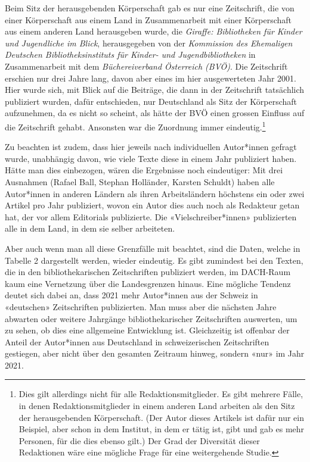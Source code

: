 \documentclass[a4paper,
fontsize=11pt,
oneside,
numbers=noperiodatend,
parskip=half-,
bibliography=totoc,
final
]{scrartcl}
\begin{document}
Beim Sitz der herausgebenden Körperschaft gab es nur eine Zeitschrift,
die von einer Körperschaft aus einem Land in Zusammenarbeit mit einer
Körperschaft aus einem anderen Land herausgeben wurde, die
\emph{Giraffe: Bibliotheken für Kinder und Jugendliche im Blick},
herausgegeben von der \emph{Kommission des Ehemaligen Deutschen
Bibliotheksinstituts für Kinder- und Jugendbibliotheken} in
Zusammenarbeit mit dem \emph{Büchereiverband Österreich (BVÖ)}. Die
Zeitschrift erschien nur drei Jahre lang, davon aber eines im hier
ausgewerteten Jahr 2001. Hier wurde sich, mit Blick auf die Beiträge,
die dann in der Zeitschrift tatsächlich publiziert wurden, dafür
entschieden, nur Deutschland als Sitz der Körperschaft aufzunehmen, da
es nicht so scheint, als hätte der BVÖ einen grossen Einfluss auf die
Zeitschrift gehabt. Ansonsten war die Zuordnung immer
eindeutig.\footnote{Dies gilt allerdings nicht für alle
  Redaktionsmitglieder. Es gibt mehrere Fälle, in denen
  Redaktionsmitglieder in einem anderen Land arbeiten als den Sitz der
  herausgebenden Körperschaft. (Der Autor dieses Artikels ist dafür nur
  ein Beispiel, aber schon in dem Institut, in dem er tätig ist, gibt
  und gab es mehr Personen, für die dies ebenso gilt.) Der Grad der
  Diversität dieser Redaktionen wäre eine mögliche Frage für eine
  weitergehende Studie.}

Zu beachten ist zudem, dass hier jeweils nach individuellen Autor*innen
gefragt wurde, unabhängig davon, wie viele Texte diese in einem Jahr
publiziert haben. Hätte man dies einbezogen, wären die Ergebnisse noch
eindeutiger: Mit drei Ausnahmen (Rafael Ball, Stephan Holländer, Karsten
Schuldt) haben alle Autor*innen in anderen Ländern als ihren
Arbeitsländern höchstens ein oder zwei Artikel pro Jahr publiziert,
wovon ein Autor dies auch noch als Redakteur getan hat, der vor allem
Editorials publizierte. Die «Vielschreiber*innen» publizierten alle in
dem Land, in dem sie selber arbeiteten.

Aber auch wenn man all diese Grenzfälle mit beachtet, sind die Daten,
welche in Tabelle 2 dargestellt werden, wieder eindeutig. Es gibt
zumindest bei den Texten, die in den bibliothekarischen Zeitschriften
publiziert werden, im DACH-Raum kaum eine Vernetzung über die
Landesgrenzen hinaus. Eine mögliche Tendenz deutet sich dabei an, dass
2021 mehr Autor*innen aus der Schweiz in «deutschen» Zeitschriften
publizierten. Man muss aber die nächsten Jahre abwarten oder weitere
Jahrgänge bibliothekarischer Zeitschriften auswerten, um zu sehen, ob
dies eine allgemeine Entwicklung ist. Gleichzeitig ist offenbar der
Anteil der Autor*innen aus Deutschland in schweizerischen Zeitschriften
gestiegen, aber nicht über den gesamten Zeitraum hinweg, sondern «nur»
im Jahr 2021.
\end{document}
